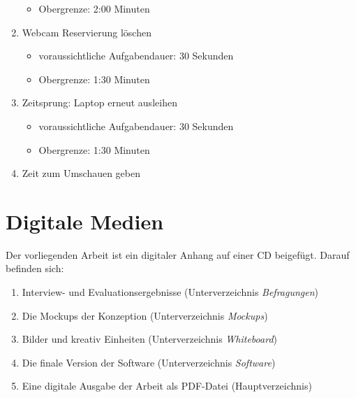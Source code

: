 \begin{enumerate}
\begin{itemize}
                \item Obergrenze: 2:00 Minuten
            \end{itemize}
    \item Webcam Reservierung löschen
            \begin{itemize}
                \item voraussichtliche Aufgabendauer: 30 Sekunden
                \item Obergrenze: 1:30 Minuten
            \end{itemize}
    \item Zeitsprung: Laptop erneut ausleihen
            \begin{itemize}
                \item voraussichtliche Aufgabendauer: 30 Sekunden
                \item Obergrenze: 1:30 Minuten
            \end{itemize}
    \item Zeit zum Umschauen geben
\end{enumerate}

\section{Digitale Medien}
\label{appendix:digitaleMedien}
Der vorliegenden Arbeit ist ein digitaler Anhang auf einer CD beigefügt. Darauf befinden sich:
{\begin{enumerate}
    \item Interview- und Evaluationsergebnisse (Unterverzeichnis \textit{Befragungen})
    \item Die Mockups der Konzeption (Unterverzeichnis \textit{Mockups})
    \item Bilder und kreativ Einheiten (Unterverzeichnis \textit{Whiteboard})
    \item Die finale Version der Software (Unterverzeichnis \textit{Software})
    \item Eine digitale Ausgabe der Arbeit als PDF-Datei (Hauptverzeichnis)
\end{enumerate}}